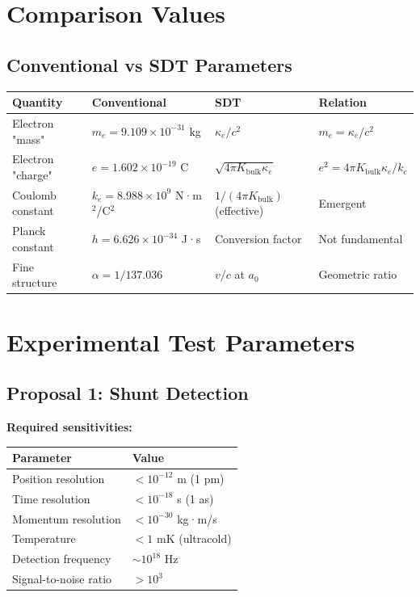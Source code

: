 \documentclass{article}
\begin{document}
\section{Comparison Values}

\subsection{Conventional vs SDT Parameters}

\begin{longtable}{llll}
\toprule
\textbf{Quantity} & \textbf{Conventional} & \textbf{SDT} & \textbf{Relation} \\
\midrule
Electron "mass" & $m_e = 9.109 \times 10^{-31}$ kg & $\kappa_e/c^2$ & $m_e = \kappa_e/c^2$ \\
Electron "charge" & $e = 1.602 \times 10^{-19}$ C & $\sqrt{4\pi K_{\text{bulk}} \kappa_e}$ & $e^2 = 4\pi K_{\text{bulk}} \kappa_e / k_e$ \\
Coulomb constant & $k_e = 8.988 \times 10^9$ N·m$^2$/C$^2$ & $1/(4\pi K_{\text{bulk}})$ (effective) & Emergent \\
Planck constant & $h = 6.626 \times 10^{-34}$ J·s & Conversion factor & Not fundamental \\
Fine structure & $\alpha = 1/137.036$ & $v/c$ at $a_0$ & Geometric ratio \\
\bottomrule
\end{longtable}

\section{Experimental Test Parameters}

\subsection{Proposal 1: Shunt Detection}

\textbf{Required sensitivities:}

\begin{longtable}{ll}
\toprule
\textbf{Parameter} & \textbf{Value} \\
\midrule
Position resolution & $< 10^{-12}$ m (1 pm) \\
Time resolution & $< 10^{-18}$ s (1 as) \\
Momentum resolution & $< 10^{-30}$ kg·m/s \\
Temperature & $< 1$ mK (ultracold) \\
Detection frequency & $\sim 10^{18}$ Hz \\
Signal-to-noise ratio & $> 10^3$ \\
\bottomrule
\end{longtable}
\end{document}
